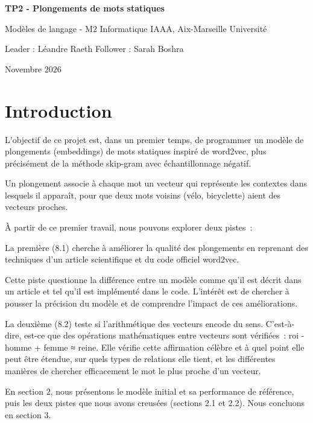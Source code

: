 \documentclass[11pt,a4paper]{article}
\begin{document}
\begin{center}
{\LARGE\bfseries TP2 - Plongements de mots statiques\par}
\vspace{0.4em}
{\large Modèles de langage - M2 Informatique IAAA, Aix-Marseille Université\par}
\vspace{0.6em}
{Leader : Léandre Raeth \qquad Follower : Sarah Boshra\par}
\vspace{0.3em}
{Novembre 2026\par}
\end{center}
\vspace{0.5em}

\section{Introduction}

L’objectif de ce projet est, dans un premier temps, de programmer un modèle de plongements (embeddings) de mots statiques inspiré de word2vec, plus précisément de la méthode skip-gram avec échantillonnage négatif.

Un plongement associe à chaque mot un vecteur qui représente les contextes dans lesquels il apparaît, pour que deux mots voisins (vélo, bicyclette) aient des vecteurs proches.

À partir de ce premier travail, nous pouvons explorer deux pistes~:

La première (8.1) cherche à améliorer la qualité des plongements en reprenant des techniques d’un article scientifique et du code officiel word2vec.

Cette piste questionne la différence entre un modèle comme qu’il est décrit dans un article et tel qu’il est implémenté dans le code. L’intérêt est de chercher à pousser la précision du modèle et de comprendre l’impact de ces améliorations.

La deuxième (8.2) teste si l’arithmétique des vecteurs encode du sens. C’est-à-dire, est-ce que des opérations mathématiques entre vecteurs sont vérifiées~: roi - homme + femme ≈ reine. Elle vérifie cette affirmation célèbre et à quel point elle peut être étendue, sur quels types de relations elle tient, et les différentes manières de chercher efficacement le mot le plus proche d’un vecteur.

En section 2, nous présentons le modèle initial et sa performance de référence, puis les deux pistes que nous avons creusées (sections 2.1 et 2.2). Nous concluons en section 3.
\end{document}
